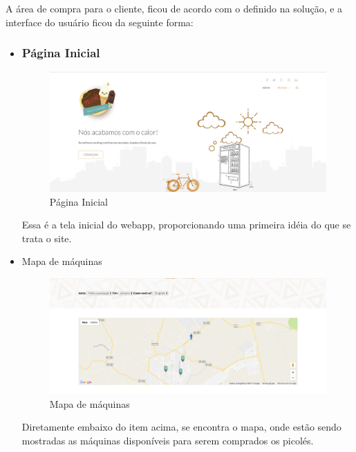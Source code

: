 A área de compra para o cliente, ficou de acordo com o definido na solução, e a interface do usuário ficou da seguinte forma:

\begin{itemize}
\item

\subsubsection{Página Inicial}

\begin{figure}[H]
	\centering
    \includegraphics[width=\textwidth]{figuras/inicio}
    \caption{Página Inicial}
    \label{fig:Página Inicial}
\end{figure}

Essa é a tela inicial do webapp, proporcionando uma primeira idéia do que se trata o site.

\item{Mapa de máquinas}

\begin{figure}[H]
	\centering
    \includegraphics[width=\textwidth]{figuras/map}
    \caption{Mapa de máquinas}
    \label{fig:Mapa de máquinas}
\end{figure}

Diretamente embaixo do item acima, se encontra o mapa, onde estão sendo mostradas as máquinas disponíveis para serem comprados os picolés.


\end{itemize}
